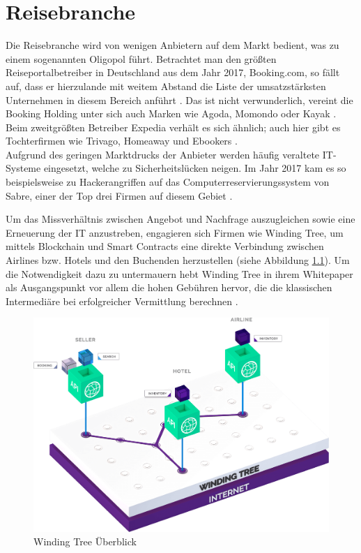 \chapter{Reisebranche}
\label{chap:Reisebranche}
Die Reisebranche wird von wenigen Anbietern auf dem Markt bedient, was zu einem sogenannten Oligopol führt. Betrachtet man den größten Reiseportalbetreiber in Deutschland aus dem Jahr 2017, Booking.com, so fällt auf, dass er hierzulande mit weitem Abstand die Liste der umsatzstärksten Unternehmen in diesem Bereich anführt \cite[vgl.][]{FVW2017}. Das ist nicht verwunderlich, vereint die Booking Holding unter sich auch Marken wie Agoda, Momondo oder Kayak \cite[vgl.][]{Booking2019}. Beim zweitgrößten Betreiber Expedia verhält es sich ähnlich; auch hier gibt es Tochterfirmen wie Trivago, Homeaway und Ebookers \cite[vgl.][]{Expedia2019}.\\
Aufgrund des geringen Marktdrucks der Anbieter werden häufig veraltete IT-Systeme eingesetzt, welche zu Sicherheitslücken neigen. Im Jahr 2017 kam es so beispielsweise zu Hackerangriffen auf das Computerreservierungssystem von Sabre, einer der Top drei Firmen auf diesem Gebiet \cite[vgl.][]{Mathews2017}.

Um das Missverhältnis zwischen Angebot und Nachfrage auszugleichen sowie eine Erneuerung der IT anzustreben, engagieren sich Firmen wie Winding Tree, um mittels Blockchain und Smart Contracts eine direkte Verbindung zwischen Airlines bzw. Hotels und den Buchenden herzustellen (siehe Abbildung \ref{fig:windingTreeOverview}). Um die Notwendigkeit dazu zu untermauern hebt Winding Tree in ihrem Whitepaper als Ausgangspunkt vor allem die hohen Gebühren hervor, die die klassischen Intermediäre bei erfolgreicher Vermittlung berechnen \cite[vgl.][S. 2 f.]{WT2019}.

\begin{figure}[h!]
  \centering
  \includegraphics[width=.9\textwidth]{Bilder/WindingTreeOverview.png}
  \caption[Winding Tree Überblick]{Winding Tree Überblick \cite{WTWebsite2019}}
  \label{fig:windingTreeOverview}
\end{figure}

